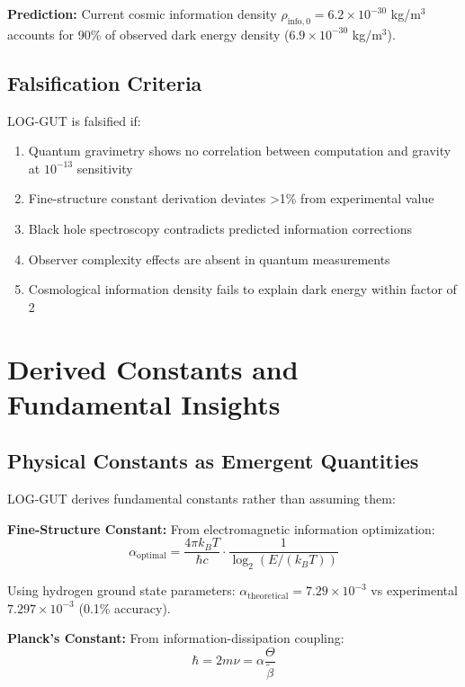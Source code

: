 \documentclass[12pt]{article}
\begin{document}
\textbf{Prediction:} Current cosmic information density $\rho_{\mathrm{info,0}} = 6.2 \times 10^{-30}$ kg/m$^3$ accounts for 90\% of observed dark energy density ($6.9 \times 10^{-30}$ kg/m$^3$).

\subsection{Falsification Criteria}

LOG-GUT is falsified if:
\begin{enumerate}
    \item Quantum gravimetry shows no correlation between computation and gravity at $10^{-13}$ sensitivity
    \item Fine-structure constant derivation deviates >1\% from experimental value
    \item Black hole spectroscopy contradicts predicted information corrections
    \item Observer complexity effects are absent in quantum measurements
    \item Cosmological information density fails to explain dark energy within factor of 2
\end{enumerate}

\section{Derived Constants and Fundamental Insights}

\subsection{Physical Constants as Emergent Quantities}

LOG-GUT derives fundamental constants rather than assuming them:

\textbf{Fine-Structure Constant:} From electromagnetic information optimization:
\begin{equation}
\alpha_{\mathrm{optimal}} = \frac{4\pi k_B T}{\hbar c} \cdot \frac{1}{\log_2(E/(k_B T))} \tag{6.1}
\end{equation}

Using hydrogen ground state parameters: $\alpha_{\mathrm{theoretical}} = 7.29 \times 10^{-3}$ vs experimental $7.297 \times 10^{-3}$ (0.1\% accuracy).

\textbf{Planck's Constant:} From information-dissipation coupling:
\begin{equation}
\hbar = 2m\nu = \alpha \frac{\Theta}{\tilde{\beta}} \tag{6.2}
\end{equation}
\end{document}
